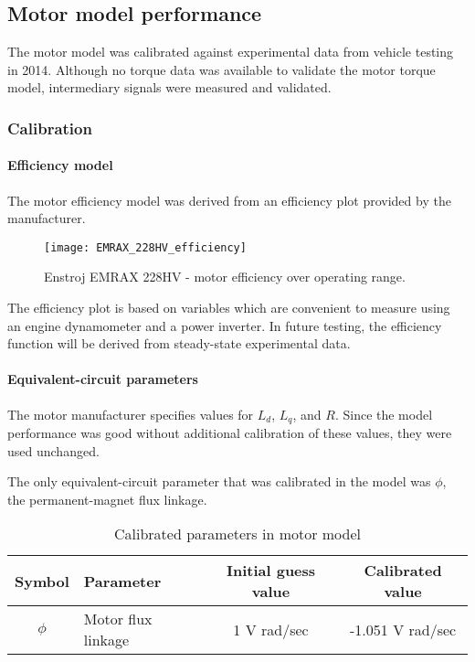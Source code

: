 \documentclass[../SimBALink.tex]{subfiles}
\begin{document}
\subsection{Motor model performance}
	The motor model was calibrated against experimental data from vehicle testing in 2014. Although no torque data was available to validate the motor torque model, intermediary signals were measured and validated.
	\subsubsection{Calibration}
		\paragraph{Efficiency model}
			The motor efficiency model was derived from an efficiency plot provided by the manufacturer. 
			
			\begin{figure}[h]
				\centering
				\texttt{[image: EMRAX\_228HV\_efficiency]}
				\caption{Enstroj EMRAX 228HV - motor efficiency over operating range.}
			\end{figure}
			\FloatBarrier
			
			The efficiency plot is based on variables which are convenient to measure using an engine dynamometer and a power inverter. In future testing, the efficiency function will be derived from steady-state experimental data.
			
		\paragraph{Equivalent-circuit parameters}
			The motor manufacturer specifies values for $L_d$, $L_q$, and $R$. Since the model performance was good without additional calibration of these values, they were used unchanged.
			
			The only equivalent-circuit parameter that was calibrated in the model was $\phi$, the permanent-magnet flux linkage.
						
			\begin{table}
				\centering
				\caption{Calibrated parameters in motor model}
				\label{table:motor_calibrated_parameters}
				\begin{tabular}{c | l | c | c}
					Symbol		&	Parameter			&	Initial guess value	&	Calibrated value	\\
					\hline
					$\phi$		&	Motor flux linkage		&	1 V rad/sec	 	&	-1.051 V rad/sec
				\end{tabular}
			\end{table}
			
\end{document}
